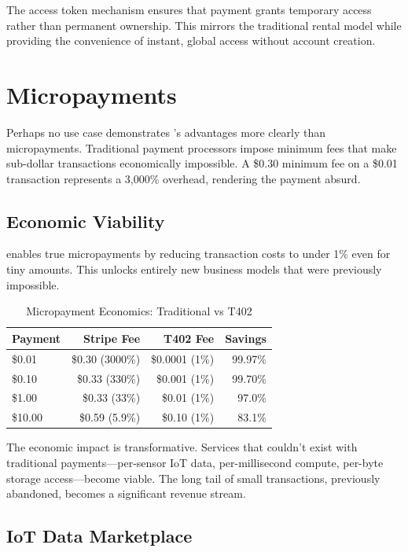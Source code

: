 The access token mechanism ensures that payment grants temporary access rather than permanent ownership. This mirrors the traditional rental model while providing the convenience of instant, global access without account creation.

\section{Micropayments}
\label{sec:micropayments}

Perhaps no use case demonstrates \tprotocol{}'s advantages more clearly than micropayments. Traditional payment processors impose minimum fees that make sub-dollar transactions economically impossible. A \$0.30 minimum fee on a \$0.01 transaction represents a 3,000\% overhead, rendering the payment absurd.

\subsection{Economic Viability}

\tprotocol{} enables true micropayments by reducing transaction costs to under 1\% even for tiny amounts. This unlocks entirely new business models that were previously impossible.

\begin{table}[htbp]
\centering
\caption{Micropayment Economics: Traditional vs T402}
\label{tab:micropayment-economics}
\footnotesize
\begin{tabular}{l r r r}
\toprule
\textbf{Payment} & \textbf{Stripe Fee} & \textbf{T402 Fee} & \textbf{Savings} \\
\midrule
\$0.01 & \$0.30 (3000\%) & \$0.0001 (1\%) & 99.97\% \\
\$0.10 & \$0.33 (330\%) & \$0.001 (1\%) & 99.70\% \\
\$1.00 & \$0.33 (33\%) & \$0.01 (1\%) & 97.0\% \\
\$10.00 & \$0.59 (5.9\%) & \$0.10 (1\%) & 83.1\% \\
\bottomrule
\end{tabular}
\end{table}

The economic impact is transformative. Services that couldn't exist with traditional payments---per-sensor IoT data, per-millisecond compute, per-byte storage access---become viable. The long tail of small transactions, previously abandoned, becomes a significant revenue stream.

\subsection{IoT Data Marketplace}

